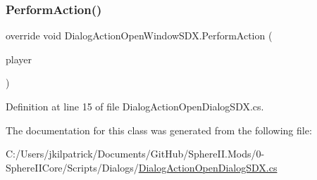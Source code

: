 \subsubsection{\texorpdfstring{PerformAction()}{PerformAction()}}
{\footnotesize\ttfamily override void Dialog\+Action\+Open\+Window\+S\+D\+X.\+Perform\+Action (\begin{DoxyParamCaption}\item[{Entity\+Player}]{player }\end{DoxyParamCaption})}



Definition at line 15 of file Dialog\+Action\+Open\+Dialog\+S\+D\+X.\+cs.



The documentation for this class was generated from the following file\+:\begin{DoxyCompactItemize}
\item 
C\+:/\+Users/jkilpatrick/\+Documents/\+Git\+Hub/\+Sphere\+I\+I.\+Mods/0-\/\+Sphere\+I\+I\+Core/\+Scripts/\+Dialogs/\mbox{\hyperlink{_dialog_action_open_dialog_s_d_x_8cs}{Dialog\+Action\+Open\+Dialog\+S\+D\+X.\+cs}}\end{DoxyCompactItemize}
